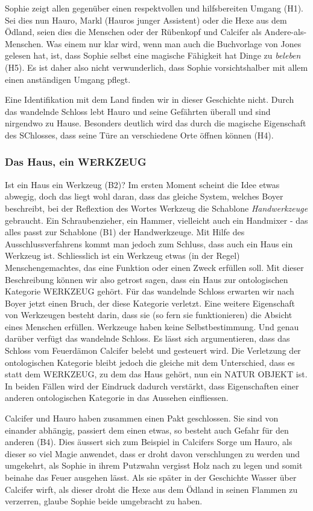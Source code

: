 Sophie zeigt allen gegenüber einen respektvollen und hilfsbereiten Umgang (H1). Sei dies nun Hauro, Markl (Hauros junger Assistent) oder die Hexe aus dem Ödland, seien dies die Menschen oder der Rübenkopf und Calcifer als Andere-als-Menschen. Was einem nur klar wird, wenn man auch die Buchvorlage von Jones gelesen hat, ist, dass Sophie selbst eine magische Fähigkeit hat Dinge zu \emph{beleben} (H5). Es ist daher also nicht verwunderlich, dass Sophie vorsichtshalber mit allem einen anständigen Umgang pflegt.

Eine Identifikation mit dem Land finden wir in dieser Geschichte nicht. Durch das wandelnde Schloss lebt Hauro und seine Gefährten überall und sind nirgendwo zu Hause. Besonders deutlich wird das durch die magische Eigenschaft des SChlosses, dass seine Türe an verschiedene Orte öffnen können (H4).

\subsubsection{Das Haus, ein WERKZEUG} 
Ist ein Haus ein Werkzeug (B2)? Im ersten Moment scheint die Idee etwas abwegig, doch das liegt wohl daran, dass das gleiche System, welches Boyer beschreibt, bei der Reflextion des Wortes Werkzeug die Schablone \emph{Handwerkzeuge} gebraucht. Ein Schraubenzieher, ein Hammer, vielleicht auch ein Handmixer - das alles passt zur Schablone (B1) der Handwerkzeuge. Mit Hilfe des Ausschlussverfahrens kommt man jedoch zum Schluss, dass auch ein Haus ein Werkzeug ist. Schliesslich ist ein Werkzeug etwas (in der Regel) Menschengemachtes, das eine Funktion oder einen Zweck erfüllen soll. Mit dieser Beschreibung können wir also getrost sagen, dass ein Haus zur ontologischen Kategorie WERKZEUG gehört. Für das wandelnde Schloss erwarten wir nach Boyer jetzt einen Bruch, der diese Kategorie verletzt. Eine weitere Eigenschaft von Werkzeugen besteht darin, dass sie (so fern sie funktionieren) die Absicht eines Menschen erfüllen. Werkzeuge haben keine Selbstbestimmung. Und genau darüber verfügt das wandelnde Schloss. Es lässt sich argumentieren, dass das Schloss vom Feuerdämon Calcifer belebt und gesteuert wird. Die Verletzung der ontologischen Kategorie bleibt jedoch die gleiche mit dem Unterschied, dass es statt dem WERKZEUG, zu dem das Haus gehört, nun ein NATUR OBJEKT ist. In beiden Fällen wird der Eindruck dadurch verstärkt, dass Eigenschaften einer anderen ontologischen Kategorie in das Aussehen einfliessen. 

Calcifer und Hauro haben zusammen einen Pakt geschlossen. Sie sind von einander abhängig, passiert dem einen etwas, so besteht auch Gefahr für den anderen (B4). Dies äussert sich zum Beispiel in Calcifers Sorge um Hauro, als dieser so viel Magie anwendet, dass er droht davon verschlungen zu werden und umgekehrt, als Sophie in ihrem Putzwahn vergisst Holz nach zu legen und somit beinahe das Feuer ausgehen lässt. Als sie später in der Geschichte Wasser über Calcifer wirft, als dieser droht die Hexe aus dem Ödland in seinen Flammen zu verzerren, glaube Sophie beide umgebracht zu haben.

